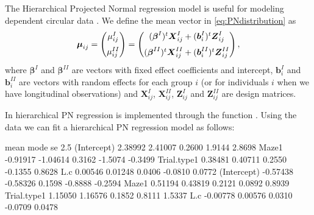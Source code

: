 The Hierarchical Projected Normal regression model is useful for
modeling dependent circular data \citep{nunez2014bayesian}. We define
the mean vector in \eqref{eq:PNdistribution} as \begin{equation}
\boldsymbol{\mu}_{ij} = \begin{pmatrix}
  \mu_{ij}^{I}  \vspace{0.2cm}  \\
\mu_{ij}^{II}
 \end{pmatrix}=\begin{pmatrix}
  (\boldsymbol{\beta}^{I})^{t}\boldsymbol{X}_{ij}^{I} + (\boldsymbol{b}_i^{I})^t\boldsymbol{Z}_{ij}^{I} \vspace{0.2cm}  \\
  (\boldsymbol{\beta}^{II})^{t}\boldsymbol{X}_{ij}^{II} + (\boldsymbol{b}_i^{II})^t\boldsymbol{Z}_{ij}^{II}
 \end{pmatrix},
\end{equation} where \(\boldsymbol{\beta}^{I}\) and
\(\boldsymbol{\beta}^{II}\) are vectors with fixed effect coefficients
and intercept, \(\boldsymbol{b}_{i}^{I}\) and
\(\boldsymbol{b}_{i}^{II}\) are vectors with random effects for each
group \(i\) (or for individuals \(i\) when we have longitudinal
observations) and \(\boldsymbol{X}_{ij}^{I}\),
\(\boldsymbol{X}_{ij}^{II}\), \(\boldsymbol{Z}_{ij}^{I}\) and
\(\boldsymbol{Z}_{ij}^{II}\) are design matrices.

In  hierarchical PN regression is implemented through the
function . Using the  data
\citep{Warren2017} we can fit a hierarchical PN regression model as
follows:

\begin{CodeChunk}


\begin{CodeOutput}
                mean     mode     se    2.5%
(Intercept)  2.38992  2.41007 0.2600  1.9144  2.8698
Maze1       -0.91917 -1.04614 0.3162 -1.5074 -0.3499
Trial.type1  0.38481  0.40711 0.2550 -0.1355  0.8628
L.c          0.00546  0.01248 0.0406 -0.0810  0.0772
(Intercept) -0.57438 -0.58326 0.1598 -0.8888 -0.2594
Maze1        0.51194  0.43819 0.2121  0.0892  0.8939
Trial.type1  1.15050  1.16576 0.1852  0.8111  1.5337
L.c         -0.00778  0.00576 0.0310 -0.0709  0.0478
\end{CodeOutput}
\end{CodeChunk}

